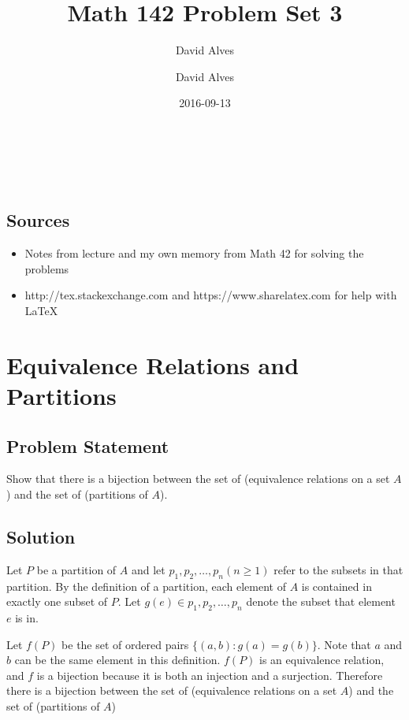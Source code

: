 \documentclass[12pt]{article}
\author{David Alves}
\title{Math 142 Problem Set 3}
\author{David Alves}
\date{2016-09-13}
\begin{document}

\begin{center}
\Large \thetitle \\
\large \theauthor \\
\thedate
\end{center}

\subsection*{Sources}

    \begin{itemize}
    \item Notes from lecture and my own memory from Math 42 for solving the problems
    \item http://tex.stackexchange.com and https://www.sharelatex.com for help with \LaTeX
    \end{itemize}

\section{Equivalence Relations and Partitions}

\subsection*{Problem Statement}
Show that there is a bijection between the set of (equivalence relations on a set $A$) and the set of (partitions of $A$). 
\subsection*{Solution}


Let $P$ be a partition of $A$ and let $p_1, p_2, \ldots, p_n (n\geq 1)$ refer to the subsets in that partition. By the definition of a partition, each element of $A$ is contained in exactly one subset of $P$. Let $g(e) \in p_1, p_2, \ldots, p_n$ denote the subset that element $e$ is in.

Let $f(P)$ be the set of ordered pairs $\{(a, b) : g(a) = g(b)\}$. Note that $a$ and $b$ can be the same element in this definition. $f(P)$ is an equivalence relation, and $f$ is a bijection because it is both an injection and a surjection. Therefore there is a bijection between the set of (equivalence relations on a set $A$) and the set of (partitions of $A$)
\end{document}
